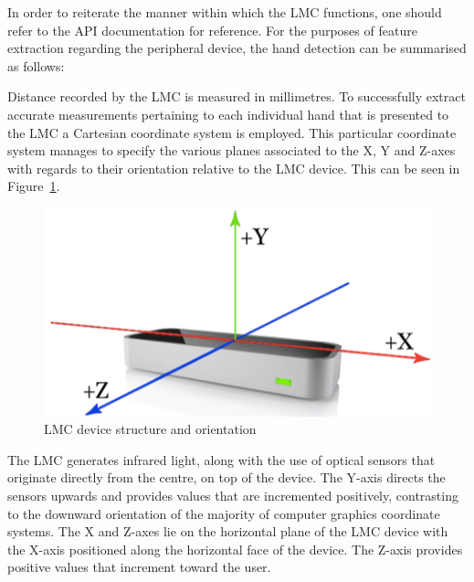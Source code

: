 In order to reiterate the manner within which the LMC functions, one should refer to the API documentation for reference. For the purposes of feature extraction regarding the peripheral device, the hand detection can be summarised as follows:

Distance recorded by the LMC is measured in millimetres. 
To successfully extract accurate measurements pertaining to each individual hand that is presented to the LMC a Cartesian coordinate system is employed. 	This particular coordinate system manages to specify the various planes associated to the X, Y and Z-axes with regards to their orientation relative to the LMC device. This can be seen in Figure~\ref{fig:LMC device structure and orientation}. 

    
    \begin{figure}[htbp!] 
    \centering    
    \includegraphics[width=1.0\textwidth]{Chapter3/Figs/Figure3-5.png}
    \caption[LMC device structure and orientation]{LMC device structure and orientation}
    \label{fig:LMC device structure and orientation}
    \end{figure}


The LMC generates infrared light, along with the use of optical sensors that originate directly from the centre, on top of the device. The Y-axis directs the sensors upwards and provides values that are incremented positively, contrasting to the downward orientation of the majority of computer graphics coordinate systems. The X and Z-axes lie on the horizontal plane of the LMC device with the X-axis positioned along the horizontal face of the device. The Z-axis provides positive values that increment toward the user. 

